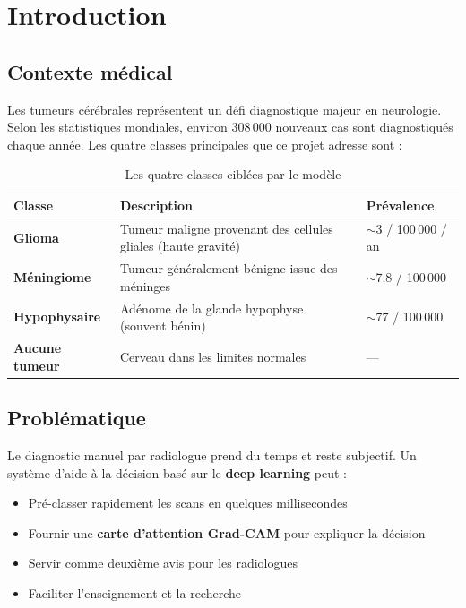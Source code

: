 \documentclass[11pt,a4paper,oneside]{report}
\newcommand{\rt}[1]{\textcolor{accentred}{#1}}
\newcommand{\og}[1]{\textcolor{accentorange}{#1}}
\newcommand{\gn}[1]{\textcolor{accentgreen}{#1}}
\newcommand{\bl}[1]{\textcolor{accentblue}{#1}}
\begin{document}
\chapter{Introduction}

\section{Contexte médical}

Les tumeurs cérébrales représentent un défi diagnostique majeur en neurologie. Selon les statistiques mondiales, environ 308\,000 nouveaux cas sont diagnostiqués chaque année. Les quatre classes principales que ce projet adresse sont :

\begin{table}[!htbp]
\centering
\caption{Les quatre classes ciblées par le modèle}
\begin{tabularx}{\textwidth}{|l|X|l|}
\hline
\rowcolor{}
\textbf{Classe} & \textbf{Description} & \textbf{Prévalence} \\
\hline
\rt{\textbf{Glioma}} & Tumeur maligne provenant des cellules gliales (haute gravité) & $\sim$3 / 100\,000 / an \\
\hline
\og{\textbf{Méningiome}} & Tumeur généralement bénigne issue des méninges & $\sim$7.8 / 100\,000 \\
\hline
\bl{\textbf{Hypophysaire}} & Adénome de la glande hypophyse (souvent bénin) & $\sim$77 / 100\,000 \\
\hline
\gn{\textbf{Aucune tumeur}} & Cerveau dans les limites normales & --- \\
\hline
\end{tabularx}
\end{table}

\section{Problématique}

Le diagnostic manuel par radiologue prend du temps et reste subjectif. Un système d'aide à la décision basé sur le \textbf{deep learning} peut :
\begin{itemize}
\item Pré-classer rapidement les scans en quelques millisecondes
\item Fournir une \textbf{carte d'attention Grad-CAM} pour expliquer la décision
\item Servir comme deuxième avis pour les radiologues
\item Faciliter l'enseignement et la recherche
\end{itemize}
\end{document}
